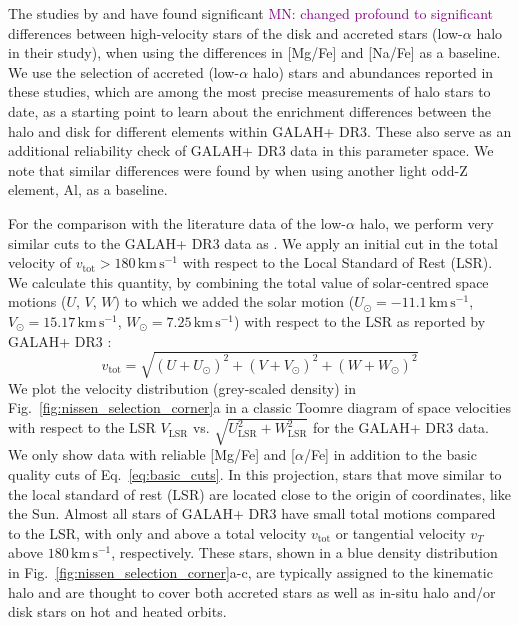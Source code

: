 \documentclass[fleqn,usenatbib]{mnras}
\newcommand{\mkn}[1]{{\textcolor{purple}{MN: #1}}}
\newcommand{\kms}{\,\mathrm{km\,s^{-1}}}	%
\begin{document}
The studies by \citet{Nissen2010,Nissen2011,Nissen2012} and \citet{Nissen2014} have found significant \mkn{changed profound to significant} differences between high-velocity stars of the disk and accreted stars (low-$\alpha$ halo in their study), when using the differences in [Mg/Fe] and [Na/Fe] as a baseline. We use the selection of accreted (low-$\alpha$ halo) stars and abundances reported in these studies, which are among the most precise measurements of halo stars to date, as a starting point to learn about the enrichment differences between the halo and disk for different elements within GALAH+ DR3. These also serve as an additional reliability check of GALAH+ DR3 data in this parameter space. We note that similar differences were found by \citet{Hawkins2015} when using another light odd-Z element, Al, as a baseline.

For the comparison with the literature data of the low-$\alpha$ halo, we perform very similar cuts to the GALAH+ DR3 data as \cite{Nissen2010}. We apply an initial cut in the total velocity of $v_\text{tot} > 180\kms$ with respect to the Local Standard of Rest (LSR). We calculate this quantity, by combining the total value of solar-centred space motions ($U$, $V$, $W$) to which we added the solar motion ($U_\odot = -11.1\kms$, $V_\odot = 15.17\kms$, $W_\odot = 7.25\kms$) with respect to the LSR as reported by GALAH+ DR3 \citep{Buder2021}:
\begin{equation}
v_\text{tot} = \sqrt{ \left(U + U_\odot \right)^2 + \left(V + V_\odot \right)^2 + \left(W + W_\odot \right)^2} \label{eq:total_velocity}
\end{equation}
We plot the velocity distribution (grey-scaled density) in Fig.~\ref{fig:nissen_selection_corner}a in a classic Toomre diagram of space velocities with respect to the LSR $V_\text{LSR}$ vs. $\sqrt{U_\text{LSR}^2 + W_\text{LSR}^2}$ for the GALAH+ DR3 data. We only show data with reliable [Mg/Fe] and [$\alpha$/Fe] in addition to the basic quality cuts of Eq.~\ref{eq:basic_cuts}. In this projection, stars that move similar to the local standard of rest (LSR) are located close to the origin of coordinates, like the Sun. Almost all stars of GALAH+ DR3 have small total motions compared to the LSR, with only  and  above a total velocity $v_\text{tot}$ or tangential velocity $v_T$ above $180\kms$, respectively. These stars, shown in a blue density distribution in Fig.~\ref{fig:nissen_selection_corner}a-c, are typically assigned to the kinematic halo \citep[e.g.][]{Venn2004} and are thought to cover both accreted stars as well as in-situ halo and/or disk stars on hot and heated orbits.
\end{document}
